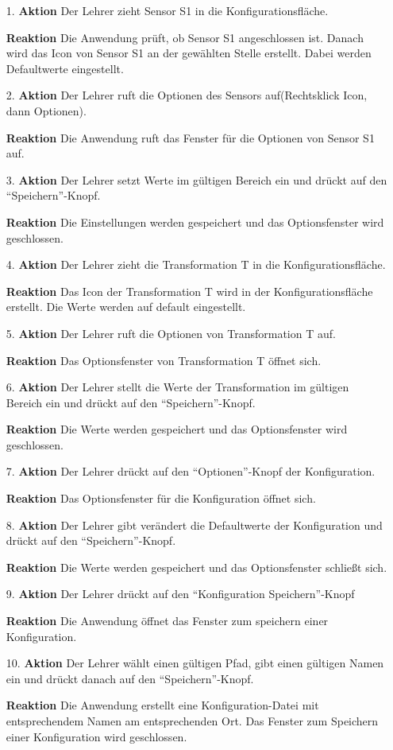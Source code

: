 \documentclass[parskip=full]{scrartcl}
\begin{document}
\begin{itemize}
\begin{itemize}
\item [1.]\textbf{Aktion} Der Lehrer zieht Sensor S1 in die Konfigurationsfläche. 
\item []\textbf{Reaktion} Die Anwendung prüft, ob Sensor S1 angeschlossen ist. Danach wird das Icon von Sensor S1 an der gewählten Stelle erstellt. Dabei werden Defaultwerte eingestellt.
\item [2.]\textbf{Aktion} Der Lehrer ruft die Optionen des Sensors auf(Rechtsklick Icon, dann Optionen).
\item []\textbf{Reaktion} Die Anwendung ruft das Fenster für die Optionen von Sensor S1 auf.
\item [3.]\textbf{Aktion} Der Lehrer setzt Werte im gültigen Bereich ein und drückt auf den "`Speichern"'-Knopf.
\item []\textbf{Reaktion} Die Einstellungen werden gespeichert und das Optionsfenster wird geschlossen.
\item [4.]\textbf{Aktion} Der Lehrer zieht die Transformation T in die Konfigurationsfläche.
\item []\textbf{Reaktion} Das Icon der Transformation T wird in der Konfigurationsfläche erstellt. Die Werte werden auf default eingestellt.
\item [5.]\textbf{Aktion} Der Lehrer ruft die Optionen von Transformation T auf.
\item []\textbf{Reaktion} Das Optionsfenster von Transformation T öffnet sich.
\item [6.]\textbf{Aktion} Der Lehrer stellt die Werte der Transformation im gültigen Bereich ein und drückt auf den "`Speichern"'-Knopf.
\item []\textbf{Reaktion} Die Werte werden gespeichert und das Optionsfenster wird geschlossen.
\item [7.]\textbf{Aktion}  Der Lehrer drückt auf den "`Optionen"'-Knopf der Konfiguration.
\item []\textbf{Reaktion} Das Optionsfenster für die Konfiguration öffnet sich.
\item [8.]\textbf{Aktion} Der Lehrer gibt verändert die Defaultwerte der Konfiguration und drückt auf den "`Speichern"'-Knopf.
\item []\textbf{Reaktion} Die Werte werden gespeichert und das Optionsfenster schließt sich.
\item [9.]\textbf{Aktion} Der Lehrer drückt auf den "`Konfiguration Speichern"'-Knopf
\item []\textbf{Reaktion} Die Anwendung öffnet das Fenster zum speichern einer Konfiguration.
\item [10.]\textbf{Aktion} Der Lehrer wählt einen gültigen Pfad, gibt einen gültigen Namen ein und drückt danach auf den "`Speichern"'-Knopf.
\item []\textbf{Reaktion} Die Anwendung erstellt eine Konfiguration-Datei mit entsprechendem Namen am entsprechenden Ort. Das Fenster zum Speichern einer Konfiguration wird geschlossen.



\end{itemize}
\end{itemize}
\end{document}
